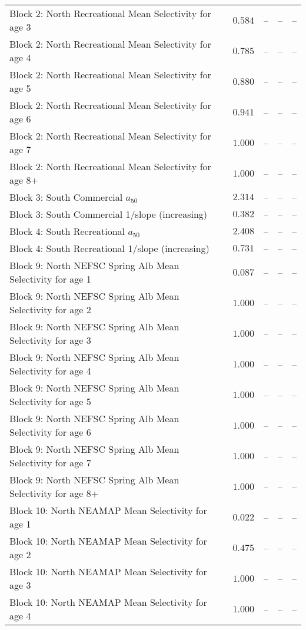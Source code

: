 \documentclass[
]{article}
\begin{document}
\begin{landscape}
\begin{longtable}[t]{lrrrr}
\addlinespace
Block 2: North Recreational Mean Selectivity for age 3 & $0.584$ & -- & -- & --\\
Block 2: North Recreational Mean Selectivity for age 4 & $0.785$ & -- & -- & --\\
Block 2: North Recreational Mean Selectivity for age 5 & $0.880$ & -- & -- & --\\
Block 2: North Recreational Mean Selectivity for age 6 & $0.941$ & -- & -- & --\\
Block 2: North Recreational Mean Selectivity for age 7 & $1.000$ & -- & -- & --\\
\addlinespace
Block 2: North Recreational Mean Selectivity for age 8+ & $1.000$ & -- & -- & --\\
Block 3: South Commercial $a_{50}$ & $2.314$ & -- & -- & --\\
Block 3: South Commercial 1/slope (increasing) & $0.382$ & -- & -- & --\\
Block 4: South Recreational $a_{50}$ & $2.408$ & -- & -- & --\\
Block 4: South Recreational 1/slope (increasing) & $0.731$ & -- & -- & --\\
\addlinespace
Block 9: North NEFSC Spring Alb Mean Selectivity for age 1 & $0.087$ & -- & -- & --\\
Block 9: North NEFSC Spring Alb Mean Selectivity for age 2 & $1.000$ & -- & -- & --\\
Block 9: North NEFSC Spring Alb Mean Selectivity for age 3 & $1.000$ & -- & -- & --\\
Block 9: North NEFSC Spring Alb Mean Selectivity for age 4 & $1.000$ & -- & -- & --\\
Block 9: North NEFSC Spring Alb Mean Selectivity for age 5 & $1.000$ & -- & -- & --\\
\addlinespace
Block 9: North NEFSC Spring Alb Mean Selectivity for age 6 & $1.000$ & -- & -- & --\\
Block 9: North NEFSC Spring Alb Mean Selectivity for age 7 & $1.000$ & -- & -- & --\\
Block 9: North NEFSC Spring Alb Mean Selectivity for age 8+ & $1.000$ & -- & -- & --\\
Block 10: North NEAMAP Mean Selectivity for age 1 & $0.022$ & -- & -- & --\\
Block 10: North NEAMAP Mean Selectivity for age 2 & $0.475$ & -- & -- & --\\
\addlinespace
Block 10: North NEAMAP Mean Selectivity for age 3 & $1.000$ & -- & -- & --\\
Block 10: North NEAMAP Mean Selectivity for age 4 & $1.000$ & -- & -- & --\\

\end{longtable}
\end{landscape}
\end{document}
